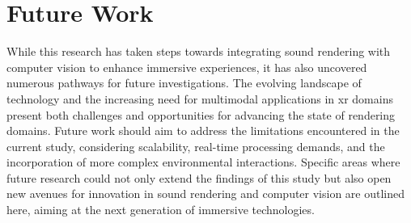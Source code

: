 \section{Future Work}
While this research has taken steps towards integrating sound rendering with computer vision to enhance immersive experiences, it has also uncovered numerous pathways for future investigations. The evolving landscape of technology and the increasing need for multimodal applications in \acrshort{xr} domains present both challenges and opportunities for advancing the state of rendering domains. Future work should aim to address the limitations encountered in the current study, considering scalability, real-time processing demands, and the incorporation of more complex environmental interactions. Specific areas where future research could not only extend the findings of this study but also open new avenues for innovation in sound rendering and computer vision are outlined here, aiming at the next generation of immersive technologies.

